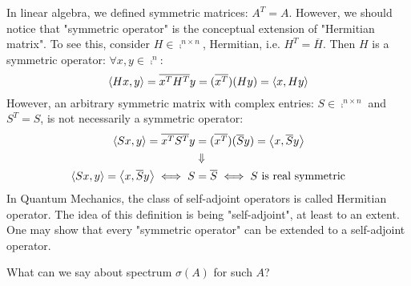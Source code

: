\begin{remark}\nl
	In linear algebra, we defined symmetric matrices: $A^T=A$. However, we should notice that "symmetric operator" is the conceptual extension of "Hermitian matrix". To see this, consider $H\in\comp^{n\times n}$, Hermitian, i.e. $H^T=\overline{H}$. Then $H$ is a symmetric operator: $\forall x,y\in\comp^n$:
	$$
	\left<{Hx},{y}\right>=\overline{x^TH^T}y=(\overline{x^T})(Hy)=\left<{x},{Hy}\right>
	$$
	However, an arbitrary symmetric matrix with complex entries: $S\in\comp^{n\times n}$ and $S^T=S$, is not necessarily a symmetric operator:
\begin{equation}
    \begin{split}
        \left<{Sx},{y}\right>=\overline{x^TS^T}y&=(\overline{x^T})(\overline{S}y)=\left<{x},{\overline{S}y}\right>\\
        &\Downarrow\\
        \left<{Sx},{y}\right>=\left<{x},{\overline{S}y}\right>\iff S&=\overline{S}\iff S\text{ is real symmetric} 
    \end{split}
\end{equation}
	In Quantum Mechanics, the class of self-adjoint operators is called Hermitian operator. The idea of this definition is being "self-adjoint", at least to an extent. One may show that every "symmetric operator" can be extended to a self-adjoint operator.  
\end{remark}
What can we say about spectrum $\sigma(A)$ for such $A$?

